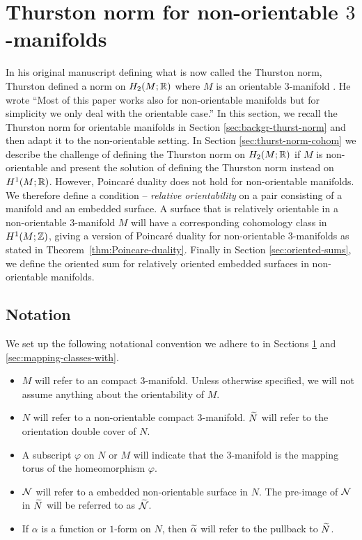 \section{Thurston norm for non-orientable $3$-manifolds}
\label{sec:thur-norm-non-orientable}
In his original manuscript defining what is now called the Thurston norm, Thurston defined a norm on $H_2(M;\mathbb{R})$ where $M$ is an orientable 3-manifold \cite{thurston1986norm}.  He wrote ``Most of this paper works also for non-orientable manifolds but for simplicity we only deal with the orientable case.''
In this section, we recall the Thurston norm for orientable manifolds in Section \ref{sec:backgr-thurst-norm} and then adapt it to the non-orientable setting.
In Section \ref{sec:thurst-norm-cohom} we describe the challenge of defining the Thurston norm on $H_2(M;\mathbb{R})$ if $M$ is non-orientable and present the solution of defining the Thurston norm instead on $H^1(M;\mathbb{R})$.
However, Poincar\'e duality does not hold for non-orientable manifolds.
We therefore define a condition -- {\it relative orientability} on a pair consisting of a manifold and an embedded surface.
A surface that is relatively orientable in a non-orientable 3-manifold $M$ will have a corresponding cohomology class in $H^1(M;\mathbb{Z})$, giving a version of Poincar\'e duality for non-orientable 3-manifolds as stated in Theorem~\ref{thm:Poincare-duality}.
Finally in Section \ref{sec:oriented-sums}, we define the oriented sum for relatively oriented embedded surfaces in non-orientable manifolds.

\subsection*{Notation}

We set up the following notational convention we adhere to in Sections \ref{sec:thur-norm-non-orientable} and \ref{sec:mapping-classes-with}.
\begin{itemize}
    \item $M$ will refer to an compact $3$-manifold. Unless otherwise specified, we will not assume anything about the orientability of $M$.
    \item $N$ will refer to a non-orientable compact $3$-manifold. $\widetilde{N}$ will refer to the orientation double cover of $N$.
    \item A subscript $\varphi$ on $N$ or $M$ will indicate that the $3$-manifold is the mapping torus of the homeomorphism $\varphi$.
    \item $\mathcal{N}$ will refer to a embedded non-orientable surface in $N$. The pre-image of $\mathcal{N}$ in $\widetilde{N}$ will be referred to as $\widetilde{\mathcal{N}}$.
    \item If $\alpha$ is a function or $1$-form on $N$, then $\widetilde{\alpha}$ will refer to the pullback to $\widetilde{N}$.
\end{itemize}

